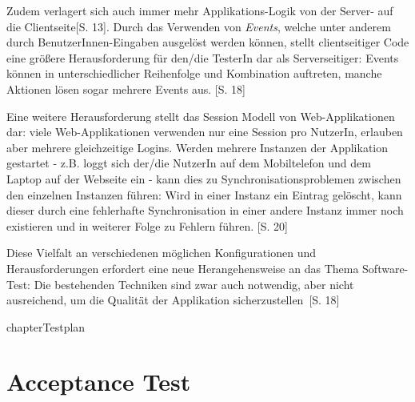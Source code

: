 \documentclass[a4paper,bibtotoc,oneside]{scrbook}
\begin{document}
Zudem verlagert sich auch immer mehr Applikations-Logik von der Server- auf die Clientseite\cite{testing_apps_on_web}[S. 13]. Durch das Verwenden von \emph{Events}, welche unter anderem durch BenutzerInnen-Eingaben ausgelöst werden können, stellt clientseitiger Code eine größere Herausforderung für den/die TesterIn dar als Serverseitiger: Events können in unterschiedlicher Reihenfolge und Kombination auftreten, manche Aktionen lösen sogar mehrere Events aus. \cite{testing_apps_on_web}[S. 18]

Eine weitere Herausforderung stellt das Session Modell von Web-Applikationen dar: viele Web-Applikationen verwenden nur eine Session pro NutzerIn, erlauben aber mehrere gleichzeitige Logins. Werden mehrere Instanzen der Applikation gestartet - z.B. loggt sich der/die NutzerIn auf dem Mobiltelefon und dem Laptop auf der Webseite ein - kann dies zu Synchronisationsproblemen zwischen den einzelnen Instanzen führen: Wird in einer Instanz ein Eintrag gelöscht, kann dieser durch eine fehlerhafte Synchronisation in einer andere Instanz immer noch existieren und in weiterer Folge zu Fehlern führen. \cite{testing_apps_on_web}[S. 20]

Diese Vielfalt an verschiedenen möglichen Konfigurationen und Herausforderungen erfordert eine neue Herangehensweise an das Thema Software-Test: Die bestehenden Techniken sind \glqq zwar auch notwendig, aber nicht ausreichend, um die Qualität der Applikation sicherzustellen\grqq\ \cite{eval_automat_webapp_test}[S. 18]



chapter{Testplan}







\chapter{Acceptance Test}
%
%
\end{document}
